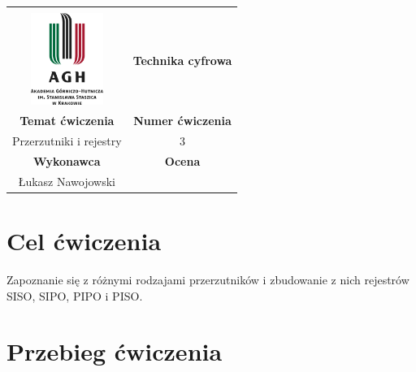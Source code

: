 \documentclass[12pt,a4paper]{article}
\begin{document}
\begin{table}[H]
\centering
\label{my-label}
\begin{tabular}[width=\textwidth, height=0.5]{|c|c|}
\hline									           					&                           \\
\includegraphics[height=3cm]{img/logo}             					& \textbf{Technika cyfrowa} \\ \hline
\textbf{Temat ćwiczenia} 					& \textbf{Numer ćwiczenia}  \\
Przerzutniki i rejestry	& 3                         \\ \hline
\textbf{Wykonawca}       & \textbf{Ocena}            \\
Łukasz Nawojowski          &                           \\ \hline
\end{tabular}
\end{table}

\section{Cel ćwiczenia}
Zapoznanie się z różnymi rodzajami przerzutników i zbudowanie z nich rejestrów SISO, SIPO, PIPO i PISO.

\newpage
\section{Przebieg ćwiczenia}
\end{document}
